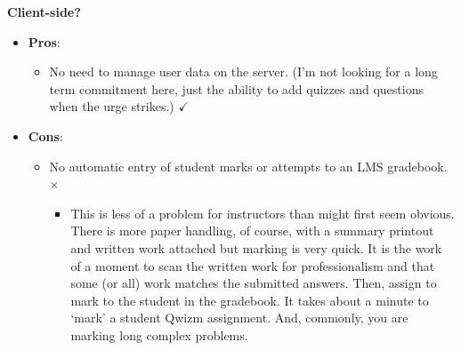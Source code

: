 \documentclass[11pt,xcolor={svgnames, x11names}]{beamer}
\begin{document}
\begin{frame}{\bf Client-side?}
 
	\begin{itemize}	
		\item<1->[] \textcolor{myGreen}{\bf Pros}:
		\begin{itemize}	[<+->] 	
			\item No need to manage user data on the server. (I'm not looking for a long term commitment here, just the ability to add quizzes and questions when the urge strikes.) \textcolor{myGreen}{\large $\bm \checkmark$}	
		\end{itemize}
		\item<1->[] \textcolor{saitMaroon}{\bf Cons}:
		\begin{itemize}
			\item No automatic entry of student marks or attempts to an LMS gradebook. \textcolor{saitMaroon}{\large $\bm \times $} 
			\begin{itemize}
				\item This is less of a problem for instructors than might first seem obvious. There is more paper handling, of course, with a summary printout and written work attached but marking is very quick. It is the work of a moment to scan the written work for professionalism and that some (or all) work matches the submitted answers. Then, assign to mark to the student in the gradebook. It takes about a minute to `mark' a student Qwizm assignment. And, commonly, you are marking long complex problems. 
			\end{itemize}
		\end{itemize}
	\end{itemize}
\end{frame}
\end{document}
